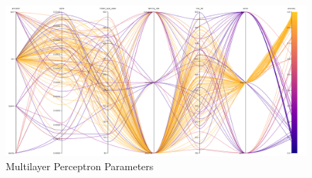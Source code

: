 \documentclass[11pt]{article}
\begin{document}
\begin{appendices}
\begin{figure}[h]
  \caption {Multilayer Perceptron Parameters} \label{ParallelCoordMLP}
  \centering 
  \includegraphics[width = \textwidth, height = \textwidth, keepaspectratio]{Images/MLP ParallelCoordGraph.png}
\end{figure}

\FloatBarrier
\end{appendices}
\end{document}
